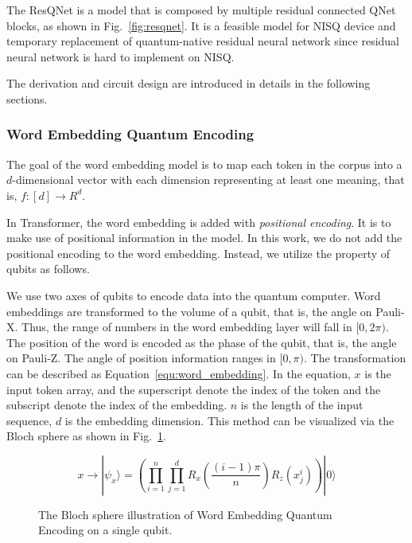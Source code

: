 The ResQNet is a model that is composed by multiple residual connected QNet blocks, as shown in Fig.~\ref{fig:resqnet}. It is a feasible model for NISQ device and temporary replacement of quantum-native residual neural network since residual neural network is hard to implement on NISQ.

The derivation and circuit design are introduced in details in the following sections.

\subsubsection{Word Embedding Quantum Encoding}
The goal of the word embedding model is to map each token in the corpus into a $d$-dimensional vector with each dimension representing at least one meaning, that is, $f: [d] \rightarrow R^d$. 

In Transformer, the word embedding is added with \emph{positional encoding}. It is to make use of positional information in the model. In this work, we do not add the positional encoding to the word embedding. Instead, we utilize the property of qubits as follows.

We use two axes of qubits to encode data into the quantum computer. Word embeddings are transformed to the volume of a qubit, that is, the angle on Pauli-X. Thus, the range of numbers in the word embedding layer will fall in $[0, 2\pi)$. The position of the word is encoded as the phase of the qubit, that is, the angle on Pauli-Z. The angle of position information ranges in $[0, \pi)$. The transformation can be described as Equation~\ref{equ:word_embedding}. In the equation, $x$ is the input token array, and the superscript denote the index of the token and the subscript denote the index of the embedding. $n$ is the length of the input sequence, $d$ is the embedding dimension. This method can be visualized via the Bloch sphere as shown in Fig.~\ref{fig:word-sphere}.

\begin{equation} \label{equ:word_embedding}
x \rightarrow |\psi_x\rangle = ( \prod_{i=1}^n \prod_{j=1}^d R_x( \frac{(i-1) \pi}{n} )R_z(x^i_j) ) |0\rangle
\end{equation}

\begin{figure}[htp]
    \centering
    \caption{The Bloch sphere illustration of Word Embedding Quantum Encoding on a single qubit.}
    \label{fig:word-sphere}
\end{figure}

